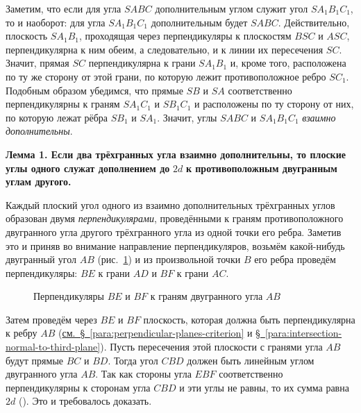 Заметим, что если для угла \(SABC\) дополнительным углом служит угол \(SA_1B_1C_1\), то и наоборот: для угла \(SA_1B_1C_1\) дополнительным будет \(SABC\). Действительно, плоскость \(SA_1B_1\), проходящая через перпендикуляры к плоскостям \(BSC\) и \(ASC\), перпендикулярна
к ним обеим, а следовательно, и к линии их пересечения \(SC\). Значит, прямая \(SC\) перпендикулярна к грани \(SA_1B_1\) и, кроме того, расположена по ту же сторону от этой грани, по которую лежит противоположное ребро \(SC_1\). Подобным образом убедимся, что прямые \(SB\) и \(SA\) соответственно перпендикулярны к граням \(SA_1C_1\) и \(SB_1C_1\) и расположены по ту сторону от них, по которую лежат рёбра \(SB_1\) и \(SA_1\). Значит, углы \(SABC\) и \(SA_1B_1C_1\) \emph{взаимно дополнительны}.

 \textbf{Лемма 1. Если два трёхгранных угла взаимно дополнительны, то плоские углы одного служат дополнением до} \(2d\) \textbf{к противоположным двугранным углам другого.}

Каждый плоский угол одного из взаимно дополнительных трёхгранных углов образован двумя \emph{перпендикулярами}, проведёнными к граням противоположного двугранного угла другого трёхгранного угла из одной точки его ребра. Заметив это и приняв во внимание направление перпендикуляров, возьмём какой-нибудь двугранный угол \(AB\) (рис.~\ref{fig:kiselev-stereo-349}) и из произвольной точки \(B\) его ребра проведём перпендикуляры: \(BE\) к грани \(AD\) и \(BF\) к грани \(AC\).

\begin{figure}[htbp]
    \centering
    \renewcommand{\thefigure}{349}
    \captionsetup{name=Рис.,labelsep=period}
    
    \caption{Перпендикуляры \(BE\) и \(BF\) к граням двугранного угла \(AB\)}\label{fig:kiselev-stereo-349}
\end{figure}

Затем проведём через \(BE\) и \(BF\) плоскость, которая должна быть перпендикулярна к ребру \(AB\) (\hyperref[para:perpendicular-planes-criterion]{см.~§~\ref*{para:perpendicular-planes-criterion}} и \hyperref[para:intersection-normal-to-third-plane]{§~\ref*{para:intersection-normal-to-third-plane}}). Пусть пересечения этой плоскости с гранями угла \(AB\) будут прямые \(BC\) и \(BD\). Тогда угол \(CBD\) должен быть линейным углом двугранного угла \(AB\). Так как стороны угла \(EBF\) соответственно перпендикулярны к сторонам угла \(CBD\) и эти углы не равны, то их сумма равна \(2d\) (). Это и требовалось доказать.

